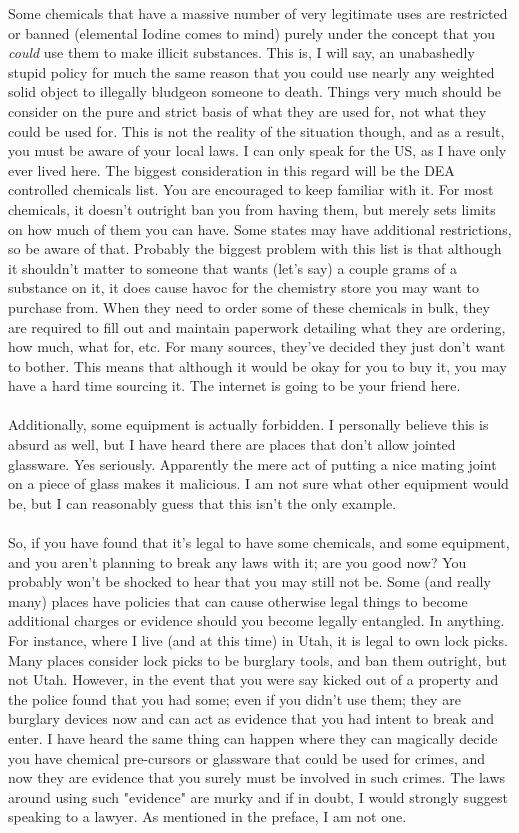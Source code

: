 \documentclass{book}
\begin{document}
Some chemicals that have a massive number of very legitimate uses are restricted or banned (elemental Iodine comes to mind) purely under the concept that you \textit{could} use them to make illicit substances.  This is, I will say, an unabashedly stupid policy for much the same reason that you could use nearly any weighted solid object to illegally bludgeon someone to death.  Things very much should be consider on the pure and strict basis of what they are used for, not what they could be used for.  This is not the reality of the situation though, and as a result, you must be aware of your local laws.  I can only speak for the US, as I have only ever lived here.  The biggest consideration in this regard will be the DEA controlled chemicals list.  You are encouraged to keep familiar with it.  For most chemicals, it doesn't outright ban you from having them, but merely sets limits on how much of them you can have.  Some states may have additional restrictions, so be aware of that.  Probably the biggest problem with this list is that although it shouldn't matter to someone that wants (let's say) a couple grams of a substance on it, it does cause havoc for the chemistry store you may want to purchase from.  When they need to order some of these chemicals in bulk, they are required to fill out and maintain paperwork detailing what they are ordering, how much, what for, etc.  For many sources, they've decided they just don't want to bother.  This means that although it would be okay for you to buy it, you may have a hard time sourcing it.  The internet is going to be your friend here.\\
\\
Additionally, some equipment is actually forbidden.  I personally believe this is absurd as well, but I have heard there are places that don't allow jointed glassware.  Yes seriously.  Apparently the mere act of putting a nice mating joint on a piece of glass makes it malicious.  I am not sure what other equipment would be, but I can reasonably guess that this isn't the only example.\\
\\
So, if you have found that it's legal to have some chemicals, and some equipment, and you aren't planning to break any laws with it; are you good now?  You probably won't be shocked to hear that you may still not be.  Some (and really many) places have policies that can cause otherwise legal things to become additional charges or evidence should you become legally entangled.  In anything.  For instance, where I live (and at this time) in Utah, it is legal to own lock picks.  Many places consider lock picks to be burglary tools, and ban them outright, but not Utah.  However, in the event that you were say kicked out of a property and the police found that you had some; even if you didn't use them; they are burglary devices now and can act as evidence that you had intent to break and enter.  I have heard the same thing can happen where they can magically decide you have chemical pre-cursors or glassware that could be used for crimes, and now they are evidence that you surely must be involved in such crimes.  The laws around using such "evidence" are murky and if in doubt, I would strongly suggest speaking to a lawyer.  As mentioned in the preface, I am not one.\\
\end{document}
